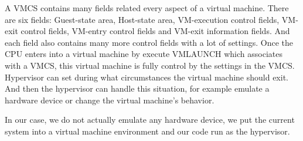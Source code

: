 A VMCS contains many fields related every aspect of a virtual machine. There are six fields: Guest-state area, Host-state area, VM-execution control fields, VM-exit control fields, VM-entry control fields and VM-exit information fields. And each field also contains many more control fields with a lot of settings. Once the CPU enters into a virtual machine by execute VMLAUNCH which associates with a VMCS, this virtual machine is fully control by the settings in the VMCS. Hypervisor can set during what circumstances the virtual machine should exit. And then the hypervisor can handle this situation, for example emulate a hardware device or change the virtual machine's behavior.

In our case, we do not actually emulate any hardware device, we put the current system into a virtual machine environment and our code run as the hypervisor.








